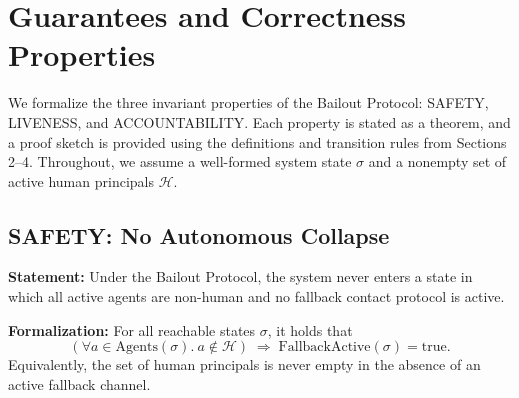 \section{Guarantees and Correctness Properties}

We formalize the three invariant properties of the Bailout Protocol: SAFETY, LIVENESS, and ACCOUNTABILITY. Each property is stated as a theorem, and a proof sketch is provided using the definitions and transition rules from Sections 2--4. Throughout, we assume a well-formed system state $\sigma$ and a nonempty set of active human principals $\mathcal{H}$.

\subsection{SAFETY: No Autonomous Collapse}

\begin{block}
\textbf{Statement:} Under the Bailout Protocol, the system never enters a state in which all active agents are non-human and no fallback contact protocol is active.

\textbf{Formalization:} For all reachable states $\sigma$, it holds that
\[
\left(\forall a \in \text{Agents}(\sigma).\ a \notin \mathcal{H}\right) \;\Longrightarrow\; \text{FallbackActive}(\sigma) = \text{true}.
\]
Equivalently, the set of human principals is never empty in the absence of an active fallback channel.
\end{block}

